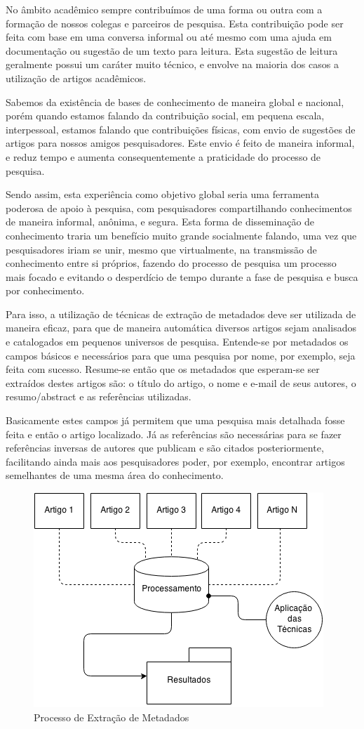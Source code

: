 \documentclass[
	12pt,               %
	openright,          %
	twoside,            %
	a4paper,            %
	english,            %
	brazil              %
	]{abntex2}
\begin{document}
No âmbito acadêmico sempre contribuímos de uma forma ou outra com a formação de nossos colegas e parceiros de pesquisa. Esta contribuição pode ser feita com base em uma conversa informal ou até mesmo com uma ajuda em documentação ou sugestão de um texto para leitura. Esta sugestão de leitura geralmente possui um caráter muito técnico, e envolve na maioria dos casos a utilização de artigos acadêmicos.

Sabemos da existência de bases de conhecimento de maneira global e nacional, porém quando estamos falando da contribuição social, em pequena escala, interpessoal, estamos falando que contribuições físicas, com envio de sugestões de artigos para nossos amigos pesquisadores. Este envio é feito de maneira informal, e reduz tempo e aumenta consequentemente a praticidade do processo de pesquisa.

Sendo assim, esta experiência como objetivo global seria uma ferramenta poderosa de apoio à pesquisa, com pesquisadores compartilhando conhecimentos de maneira informal, anônima, e segura. Esta forma de disseminação de conhecimento traria um benefício muito grande socialmente falando, uma vez que pesquisadores iriam se unir, mesmo que virtualmente, na transmissão de conhecimento entre si próprios, fazendo do processo de pesquisa um processo mais focado e evitando o desperdício de tempo durante a fase de pesquisa e busca por conhecimento.

Para isso, a utilização de técnicas de extração de metadados deve ser utilizada de maneira eficaz, para que de maneira automática diversos artigos sejam analisados e catalogados em pequenos universos de pesquisa. Entende-se por metadados os campos básicos e necessários para que uma pesquisa por nome, por exemplo, seja feita com sucesso. Resume-se então que os metadados que esperam-se ser extraídos destes artigos são: o título do artigo, o nome e e-mail de seus autores, o resumo/abstract e as referências utilizadas.

Basicamente estes campos já permitem que uma pesquisa mais detalhada fosse feita e então o artigo localizado. Já as referências são necessárias para se fazer referências inversas de autores que publicam e são citados posteriormente, facilitando ainda mais aos pesquisadores poder, por exemplo, encontrar artigos semelhantes de uma mesma área do conhecimento.

\begin{figure}
\centering
\caption{Processo de Extração de Metadados}
\label{fig:introducao}
\includegraphics[width=0.7\linewidth]{./assets/introducao}
\end{figure}
\end{document}
